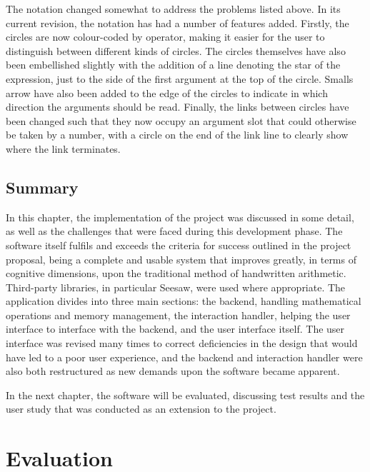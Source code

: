 \documentclass[12pt,twoside,notitlepage,xetex]{report}
\begin{document}

The notation changed somewhat to address the problems listed above.  In its
current revision, the notation has had a number of features added.  Firstly,
the circles are now colour-coded by operator, making it easier for the user to
distinguish between different kinds of circles.  The circles themselves have
also been embellished slightly with the addition of a line denoting the star of
the expression, just to the side of the first argument at the top of the
circle.  Smalls arrow have also been added to the edge of the circles to
indicate in which direction the arguments should be read.  Finally, the links
between circles have been changed such that they now occupy an argument slot
that could otherwise be taken by a number, with a circle on the end of the link
line to clearly show where the link terminates.


\section{Summary}

In this chapter, the implementation of the project was discussed in some
detail, as well as the challenges that were faced during this development
phase.  The software itself fulfils and exceeds the criteria for success
outlined in the project proposal, being a complete and usable system that
improves greatly, in terms of cognitive dimensions, upon the traditional method
of handwritten arithmetic.  Third-party libraries, in particular Seesaw, were
used where appropriate.  The application divides into three main sections: the
backend, handling mathematical operations and memory management, the
interaction handler, helping the user interface to interface with the backend,
and the user interface itself.  The user interface was revised many times to
correct deficiencies in the design that would have led to a poor user
experience, and the backend and interaction handler were also both restructured
as new demands upon the software became apparent.

In the next chapter, the software will be evaluated, discussing test results
and the user study that was conducted as an extension to the project.

\cleardoublepage
\chapter{Evaluation}
\end{document}
